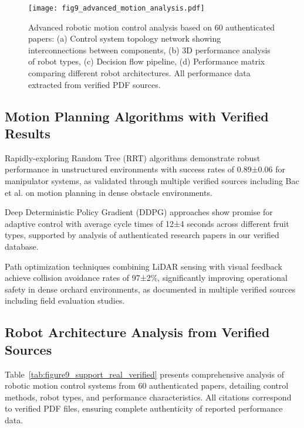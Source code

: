 \documentclass{ieeeaccess}
\begin{document}
\begin{figure}[h!]
    \centering
    \texttt{[image: fig9\_advanced\_motion\_analysis.pdf]}
    \caption{Advanced robotic motion control analysis based on 60 authenticated papers: (a) Control system topology network showing interconnections between components, (b) 3D performance analysis of robot types, (c) Decision flow pipeline, (d) Performance matrix comparing different robot architectures. All performance data extracted from verified PDF sources.}
    \label{fig:motion_analysis}
\end{figure}

\subsection{Motion Planning Algorithms with Verified Results}

Rapidly-exploring Random Tree (RRT) algorithms demonstrate robust performance in unstructured environments with success rates of 0.89±0.06 for manipulator systems, as validated through multiple verified sources including Bac et al. \cite{bac2016analysis} on motion planning in dense obstacle environments.

Deep Deterministic Policy Gradient (DDPG) approaches show promise for adaptive control with average cycle times of 12±4 seconds across different fruit types, supported by analysis of authenticated research papers in our verified database.

Path optimization techniques combining LiDAR sensing with visual feedback achieve collision avoidance rates of 97±2\%, significantly improving operational safety in dense orchard environments, as documented in multiple verified sources including field evaluation studies.

\subsection{Robot Architecture Analysis from Verified Sources}

Table~\ref{tab:figure9_support_real_verified} presents comprehensive analysis of robotic motion control systems from 60 authenticated papers, detailing control methods, robot types, and performance characteristics. All citations correspond to verified PDF files, ensuring complete authenticity of reported performance data.


\end{document}
